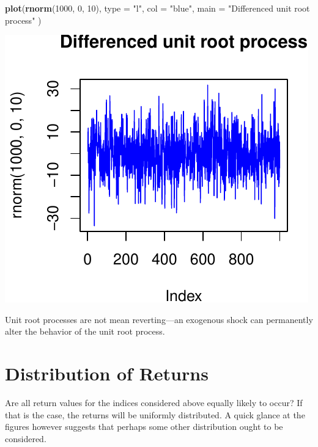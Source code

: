 \documentclass[11pt,]{article}
\newenvironment{Shaded}{\begin{snugshade}}{\end{snugshade}}
\newcommand{\KeywordTok}[1]{\textcolor[rgb]{0.13,0.29,0.53}{\textbf{#1}}}
\newcommand{\DataTypeTok}[1]{\textcolor[rgb]{0.13,0.29,0.53}{#1}}
\newcommand{\DecValTok}[1]{\textcolor[rgb]{0.00,0.00,0.81}{#1}}
\newcommand{\StringTok}[1]{\textcolor[rgb]{0.31,0.60,0.02}{#1}}
\newcommand{\NormalTok}[1]{#1}
\begin{document}
\begin{Shaded}
\begin{Highlighting}[]
\KeywordTok{plot}\NormalTok{(}\KeywordTok{rnorm}\NormalTok{(}\DecValTok{1000}\NormalTok{, }\DecValTok{0}\NormalTok{, }\DecValTok{10}\NormalTok{),}
     \DataTypeTok{type =} \StringTok{"l"}\NormalTok{,}
     \DataTypeTok{col =} \StringTok{"blue"}\NormalTok{,}
     \DataTypeTok{main =} \StringTok{"Differenced unit root process"}
\NormalTok{     )}
\end{Highlighting}
\end{Shaded}

\begin{center}\includegraphics{FMC_T4_PhD_Fin_Time_Series_files/figure-latex/unit_root-2} \end{center}

Unit root processes are not mean reverting---an exogenous shock can
permanently alter the behavior of the unit root process.

\section{Distribution of Returns}\label{distribution-of-returns}

Are all return values for the indices considered above equally likely to
occur? If that is the case, the returns will be uniformly distributed. A
quick glance at the figures however suggests that perhaps some other
distribution ought to be considered.
\end{document}
